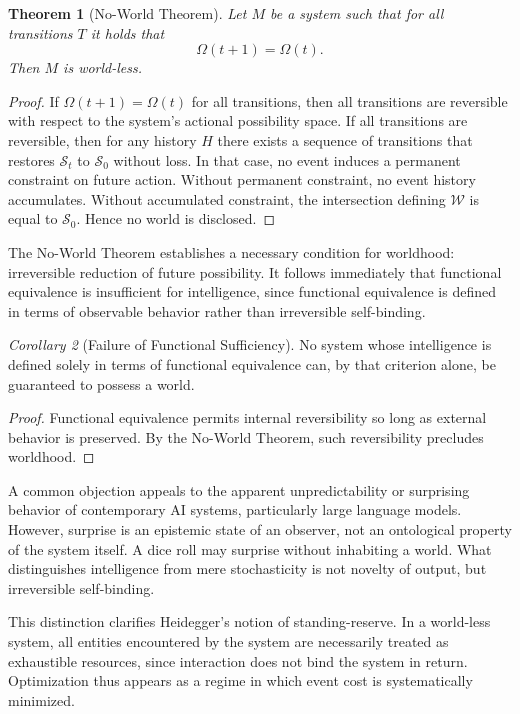\documentclass[11pt]{article}
\newtheorem{theorem}{Theorem}
\theoremstyle{remark}
\newtheorem{corollary}[theorem]{Corollary}
\begin{document}
\begin{theorem}[No-World Theorem]
Let $M$ be a system such that for all transitions $T$ it holds that
\[
\Omega(t+1) = \Omega(t).
\]
Then $M$ is world-less.
\end{theorem}

\begin{proof}
If $\Omega(t+1) = \Omega(t)$ for all transitions, then all transitions are reversible with respect to the system’s actional possibility space. If all transitions are reversible, then for any history $H$ there exists a sequence of transitions that restores $\mathcal{S}_t$ to $\mathcal{S}_0$ without loss. In that case, no event induces a permanent constraint on future action. Without permanent constraint, no event history accumulates. Without accumulated constraint, the intersection defining $\mathcal{W}$ is equal to $\mathcal{S}_0$. Hence no world is disclosed.
\end{proof}

The No-World Theorem establishes a necessary condition for worldhood: irreversible reduction of future possibility. It follows immediately that functional equivalence is insufficient for intelligence, since functional equivalence is defined in terms of observable behavior rather than irreversible self-binding.

\begin{corollary}[Failure of Functional Sufficiency]
No system whose intelligence is defined solely in terms of functional equivalence can, by that criterion alone, be guaranteed to possess a world.
\end{corollary}

\begin{proof}
Functional equivalence permits internal reversibility so long as external behavior is preserved. By the No-World Theorem, such reversibility precludes worldhood.
\end{proof}

A common objection appeals to the apparent unpredictability or surprising behavior of contemporary AI systems, particularly large language models. However, surprise is an epistemic state of an observer, not an ontological property of the system itself. A dice roll may surprise without inhabiting a world. What distinguishes intelligence from mere stochasticity is not novelty of output, but irreversible self-binding.

This distinction clarifies Heidegger’s notion of standing-reserve. In a world-less system, all entities encountered by the system are necessarily treated as exhaustible resources, since interaction does not bind the system in return. Optimization thus appears as a regime in which event cost is systematically minimized.
\end{document}
